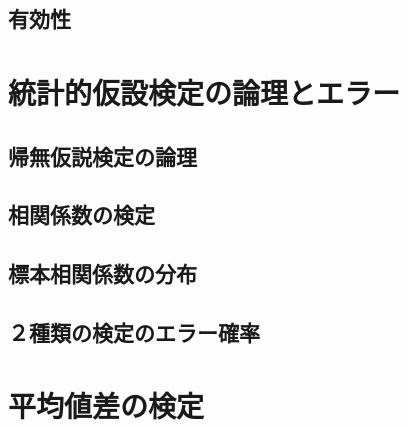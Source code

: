 \documentclass[
  a4paper,
]{ltjsbook}
\begin{document}
\hypertarget{ux6709ux52b9ux6027}{%
\section{有効性}\label{ux6709ux52b9ux6027}}


\hypertarget{ux7d71ux8a08ux7684ux4eeeux8a2dux691cux5b9aux306eux8ad6ux7406ux3068ux30a8ux30e9ux30fc}{%
\chapter{統計的仮設検定の論理とエラー}\label{ux7d71ux8a08ux7684ux4eeeux8a2dux691cux5b9aux306eux8ad6ux7406ux3068ux30a8ux30e9ux30fc}}

\hypertarget{ux5e30ux7121ux4eeeux8aacux691cux5b9aux306eux8ad6ux7406}{%
\section{帰無仮説検定の論理}\label{ux5e30ux7121ux4eeeux8aacux691cux5b9aux306eux8ad6ux7406}}

\hypertarget{ux76f8ux95a2ux4fc2ux6570ux306eux691cux5b9a}{%
\section{相関係数の検定}\label{ux76f8ux95a2ux4fc2ux6570ux306eux691cux5b9a}}

\hypertarget{ux6a19ux672cux76f8ux95a2ux4fc2ux6570ux306eux5206ux5e03}{%
\section{標本相関係数の分布}\label{ux6a19ux672cux76f8ux95a2ux4fc2ux6570ux306eux5206ux5e03}}

\hypertarget{ux7a2eux985eux306eux691cux5b9aux306eux30a8ux30e9ux30fcux78baux7387}{%
\section{２種類の検定のエラー確率}\label{ux7a2eux985eux306eux691cux5b9aux306eux30a8ux30e9ux30fcux78baux7387}}


\hypertarget{ux5e73ux5747ux5024ux5deeux306eux691cux5b9a}{%
\chapter{平均値差の検定}\label{ux5e73ux5747ux5024ux5deeux306eux691cux5b9a}}
\end{document}
